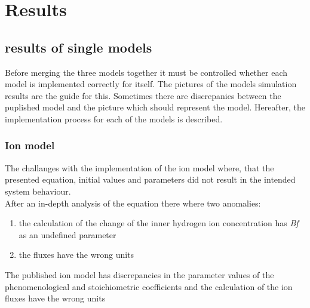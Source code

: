 \section{Results}
\subsection{results of single models}
Before merging the three models together it must be controlled whether each model is implemented correctly for itself. The pictures of the models simulation results are the guide for this. Sometimes there are discrepanies between the puplished model and the picture which should represent the model.  Hereafter, the implementation process for each of the models is described.

\subsubsection{Ion model}
The challanges with the implementation of the ion model where, that the presented equation, initial values and parameters did not result in the intended system behaviour. \\
After an in-depth analysis of the equation there where two anomalies:

\begin{enumerate}
	\item the calculation of the change of the inner hydrogen ion concentration has \emph{Bf} as an undefined parameter
	\item the fluxes have the wrong units
\end{enumerate}
 
The published ion model has discrepancies in the parameter values of the phenomenological and stoichiometric coefficients and the calculation of the ion fluxes have the wrong units 

